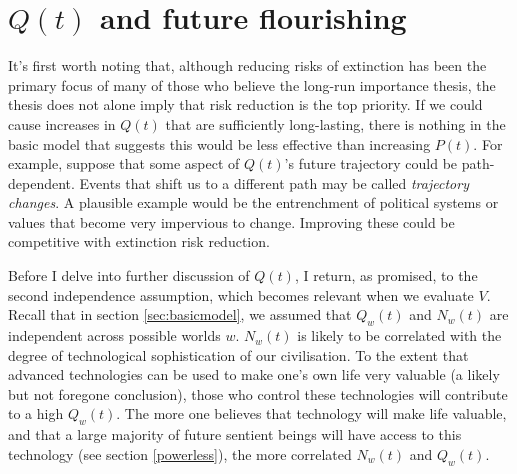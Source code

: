 \documentclass[british]{article}
\begin{document}
\section{$Q(t)$ and future flourishing}\label{qt}
It's first worth noting that, although reducing risks of extinction has been the primary focus of many of those who believe the long-run importance thesis, the thesis does not alone imply that risk reduction is the top priority. If we could cause increases in $Q(t)$ that are sufficiently long-lasting, there is nothing in the basic model that suggests this would be less effective than increasing $P(t)$. For example, suppose that some aspect of $Q(t)$'s future trajectory could be path-dependent. Events that shift us to a different path may be called \emph{trajectory changes}. A plausible example would be the entrenchment of political systems or values that become very impervious to change. Improving these could be competitive with extinction risk reduction.

Before I delve into further discussion of $Q(t)$, I return, as promised, to the second independence assumption, which becomes relevant when we evaluate $V$. Recall that in section \ref{sec:basicmodel}, we assumed that $Q_w(t)$ and $N_w(t)$ are independent across possible worlds $w$. $N_w(t)$ is likely to be correlated with the degree of technological sophistication of our civilisation. To the extent that advanced technologies can be used to make one's own life very valuable (a likely but not foregone conclusion), those who control these technologies will contribute to a high $Q_w(t)$. The more one believes that technology will make life valuable, and that a large majority of future sentient beings will have access to this technology (see section \ref{powerless}), the more correlated $N_w(t)$ and $Q_w(t)$.
\end{document}

